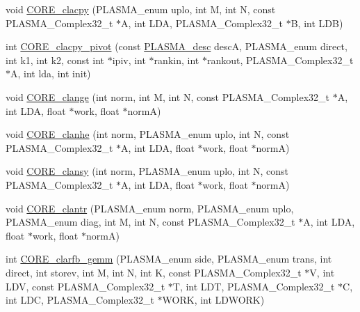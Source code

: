 \begin{DoxyCompactItemize}
\item 
void \hyperlink{group__CORE__PLASMA__Complex32__t_ga96f9b085ef950e7cfbaf7c67af7472e7_ga96f9b085ef950e7cfbaf7c67af7472e7}{C\+O\+R\+E\+\_\+clacpy} (P\+L\+A\+S\+M\+A\+\_\+enum uplo, int M, int N, const P\+L\+A\+S\+M\+A\+\_\+\+Complex32\+\_\+t $\ast$A, int L\+D\+A, P\+L\+A\+S\+M\+A\+\_\+\+Complex32\+\_\+t $\ast$B, int L\+D\+B)
\item 
int \hyperlink{group__CORE__PLASMA__Complex32__t_ga197b7315c867d0779712120031ef001e_ga197b7315c867d0779712120031ef001e}{C\+O\+R\+E\+\_\+clacpy\+\_\+pivot} (const \hyperlink{structplasma__desc__t}{P\+L\+A\+S\+M\+A\+\_\+desc} desc\+A, P\+L\+A\+S\+M\+A\+\_\+enum direct, int k1, int k2, const int $\ast$ipiv, int $\ast$rankin, int $\ast$rankout, P\+L\+A\+S\+M\+A\+\_\+\+Complex32\+\_\+t $\ast$A, int lda, int init)
\item 
void \hyperlink{group__CORE__PLASMA__Complex32__t_ga5304daa31c9f8f01320e77825915b9c0_ga5304daa31c9f8f01320e77825915b9c0}{C\+O\+R\+E\+\_\+clange} (int norm, int M, int N, const P\+L\+A\+S\+M\+A\+\_\+\+Complex32\+\_\+t $\ast$A, int L\+D\+A, float $\ast$work, float $\ast$norm\+A)
\item 
void \hyperlink{group__CORE__PLASMA__Complex32__t_ga9134237dcc37399ecb3cb87501d702f4_ga9134237dcc37399ecb3cb87501d702f4}{C\+O\+R\+E\+\_\+clanhe} (int norm, P\+L\+A\+S\+M\+A\+\_\+enum uplo, int N, const P\+L\+A\+S\+M\+A\+\_\+\+Complex32\+\_\+t $\ast$A, int L\+D\+A, float $\ast$work, float $\ast$norm\+A)
\item 
void \hyperlink{group__CORE__PLASMA__Complex32__t_ga307d845e3a58beda1391f4d51c329288_ga307d845e3a58beda1391f4d51c329288}{C\+O\+R\+E\+\_\+clansy} (int norm, P\+L\+A\+S\+M\+A\+\_\+enum uplo, int N, const P\+L\+A\+S\+M\+A\+\_\+\+Complex32\+\_\+t $\ast$A, int L\+D\+A, float $\ast$work, float $\ast$norm\+A)
\item 
void \hyperlink{group__CORE__PLASMA__Complex32__t_ga8af274e76af862faf884629524a4daed_ga8af274e76af862faf884629524a4daed}{C\+O\+R\+E\+\_\+clantr} (P\+L\+A\+S\+M\+A\+\_\+enum norm, P\+L\+A\+S\+M\+A\+\_\+enum uplo, P\+L\+A\+S\+M\+A\+\_\+enum diag, int M, int N, const P\+L\+A\+S\+M\+A\+\_\+\+Complex32\+\_\+t $\ast$A, int L\+D\+A, float $\ast$work, float $\ast$norm\+A)
\item 
int \hyperlink{group__CORE__PLASMA__Complex32__t_ga76bff5de536b4c4a64ac3c95d15ea98e_ga76bff5de536b4c4a64ac3c95d15ea98e}{C\+O\+R\+E\+\_\+clarfb\+\_\+gemm} (P\+L\+A\+S\+M\+A\+\_\+enum side, P\+L\+A\+S\+M\+A\+\_\+enum trans, int direct, int storev, int M, int N, int K, const P\+L\+A\+S\+M\+A\+\_\+\+Complex32\+\_\+t $\ast$V, int L\+D\+V, const P\+L\+A\+S\+M\+A\+\_\+\+Complex32\+\_\+t $\ast$T, int L\+D\+T, P\+L\+A\+S\+M\+A\+\_\+\+Complex32\+\_\+t $\ast$C, int L\+D\+C, P\+L\+A\+S\+M\+A\+\_\+\+Complex32\+\_\+t $\ast$W\+O\+R\+K, int L\+D\+W\+O\+R\+K)

\end{DoxyCompactItemize}
